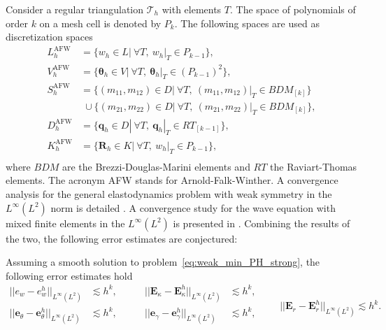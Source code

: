 Consider a regular triangulation $\mathcal{T}_h$ with elements $T$. The space of polynomials of order $k$ on a mesh cell is denoted by $P_k$. The following spaces are used as discretization spaces
\begin{equation}
\label{eq:AFW}
\begin{aligned}
L_h^{\text{AFW}} &= \{w_h \in L | \ \forall T, \ w_h|_{T} \in P_{k-1} \}, \\
V_h^{\text{AFW}} &= \{\bm{\theta}_h \in V | \ \forall T,\ \bm{\theta}_h|_{T} \in (P_{k-1})^2 \}, \\
S_h^{\text{AFW}} &= \{(m_{11}, m_{12}) \in D| \ \forall T,\ (m_{11}, m_{12})|_{T} \in BDM_{[k]} \}  \\
& \; \cup \{(m_{21}, m_{22}) \in D| \ \forall T,\ (m_{21}, m_{22})|_{T} \in BDM_{[k]} \}, \\
D_h^{\text{AFW}} &= \{\bm{q}_h \in D | \ \forall T,\ \bm{q}_h|_{T} \in RT_{[k-1]} \}, \\
K_h^{\text{AFW}} &= \{\bm{R}_h \in K | \ \forall T, \ w_h|_{T} \in P_{k-1} \}, \\ 
\end{aligned}
\end{equation}
where $BDM$ are the Brezzi-Douglas-Marini elements and $RT$ the Raviart-Thomas elements. The acronym AFW stands for Arnold-Falk-Winther. A convergence analysis for the general elastodynamics problem with weak symmetry in the $L^\infty (L^2)$ norm is detailed \cite{arnold2014elastodynamics}. A convergence study for the wave equation with mixed finite elements in the $L^\infty (L^2)$ is presented in \cite{geveci1988}. Combining the results of the two, the following error estimates are conjectured:
\begin{conjecture}
	Assuming a smooth solution to problem~\eqref{eq:weak_min_PH_strong}, the following error estimates hold 
	\begin{equation}
	\label{eq:errAFW}
	\begin{aligned}
	||e_w - e_w^h||_{L^{\infty}(L^2)} &\lesssim h^{k}, \\
	||\bm{e}_\theta - \bm{e}_\theta^h||_{L^{\infty}(L^2)} &\lesssim h^{k}, \\
	\end{aligned} \qquad
	\begin{aligned}
	||\bm{E}_\kappa - \bm{E}_\kappa^h||_{L^{\infty}(L^2)} &\lesssim  h^{k}, \\
	||\bm{e}_\gamma - \bm{e}_\gamma^ h||_{L^{\infty}(L^2)} &\lesssim  h^{k}, \\
	\end{aligned} \qquad
	||\bm{E}_r - \bm{E}_r^h||_{L^{\infty}(L^2)} \lesssim h^{k}. 
	\end{equation}
\end{conjecture}

